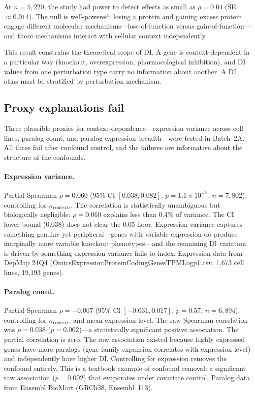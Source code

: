 \documentclass[11pt]{article}
\begin{document}
At $n = 5{,}220$, the study had power to detect effects as small as
$\rho = 0.04$ (SE $\approx 0.014$).  The null is well-powered: losing a
protein and gaining excess protein engage different molecular
mechanisms---loss-of-function versus gain-of-function---and those
mechanisms interact with cellular context independently
\citep{badonyi2025lof, chandrasekaran2024cpjump1}.

This result constrains the theoretical scope of DI.  A gene is
context-dependent in a particular way (knockout, overexpression,
pharmacological inhibition), and DI values from one perturbation type
carry no information about another.  A DI atlas must be stratified by
perturbation mechanism.


\subsection{Proxy explanations fail}

Three plausible proxies for context-dependence---expression variance
across cell lines, paralog count, and paralog expression breadth---were
tested in Batch~2A.  All three fail after confound control, and the
failures are informative about the structure of the confounds.

\paragraph{Expression variance.}
Partial Spearman $\rho = 0.060$ (95\% CI $[0.038, 0.082]$,
$p = 1.1 \times 10^{-7}$, $n = 7{,}802$), controlling for
$n_{\mathrm{contexts}}$.  The correlation is statistically unambiguous
but biologically negligible: $\rho = 0.060$ explains less than 0.4\% of
variance.  The CI lower bound (0.038) does not clear the 0.05 floor.
Expression variance captures something genuine yet peripheral---genes
with variable expression do produce marginally more variable knockout
phenotypes---and the remaining DI variation is driven by something
expression variance fails to index.  Expression data from DepMap 24Q4
(OmicsExpressionProteinCodingGenesTPMLogp1.csv, 1{,}673 cell lines,
19{,}193 genes).

\paragraph{Paralog count.}
Partial Spearman $\rho = -0.007$ (95\% CI $[-0.031, 0.017]$,
$p = 0.57$, $n = 6{,}894$), controlling for $n_{\mathrm{contexts}}$ and
mean expression level.  The raw Spearman correlation was
$\rho = 0.038$ ($p = 0.002$)---a statistically significant positive
association.  The partial correlation is zero.  The raw association
existed because highly expressed genes have more paralogs (gene family
expansion correlates with expression level) and independently have
higher DI.  Controlling for expression removes the confound entirely.
This is a textbook example of confound removal: a significant raw
association ($p = 0.002$) that evaporates under covariate control.
Paralog data from Ensembl BioMart (GRCh38, Ensembl~113).
\end{document}
